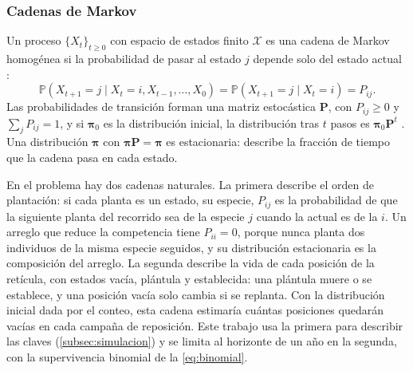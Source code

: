\subsubsection{Cadenas de Markov}
\label{subsec:markov}

Un proceso $\{X_t\}_{t\geq0}$ con espacio de estados finito $\mathcal{X}$ es una cadena de Markov homogénea si la probabilidad de pasar al estado $j$ depende solo del estado actual \autocite{:ross2014}:
\begin{equation}
  \mathbb{P}(X_{t+1}=j\mid X_t=i,X_{t-1},\dots,X_0)=\mathbb{P}(X_{t+1}=j\mid X_t=i)=P_{ij}.
  \label{eq:markov}
\end{equation}
Las probabilidades de transición forman una matriz estocástica $\mathbf{P}$, con $P_{ij}\geq0$ y $\sum_jP_{ij}=1$, y si $\boldsymbol{\pi}_0$ es la distribución inicial, la distribución tras $t$ pasos es $\boldsymbol{\pi}_0\mathbf{P}^{t}$ \autocite{:norris1997}. Una distribución $\boldsymbol{\pi}$ con $\boldsymbol{\pi}\mathbf{P}=\boldsymbol{\pi}$ es estacionaria: describe la fracción de tiempo que la cadena pasa en cada estado.

En el problema hay dos cadenas naturales. La primera describe el orden de plantación: si cada planta es un estado, su especie, $P_{ij}$ es la probabilidad de que la siguiente planta del recorrido sea de la especie $j$ cuando la actual es de la $i$. Un arreglo que reduce la competencia tiene $P_{ii}=0$, porque nunca planta dos individuos de la misma especie seguidos, y su distribución estacionaria es la composición del arreglo. La segunda describe la vida de cada posición de la retícula, con estados vacía, plántula y establecida: una plántula muere o se establece, y una posición vacía solo cambia si se replanta. Con la distribución inicial dada por el conteo, esta cadena estimaría cuántas posiciones quedarán vacías en cada campaña de reposición. Este trabajo usa la primera para describir las claves (\cref{subsec:simulacion}) y se limita al horizonte de un año en la segunda, con la supervivencia binomial de la \cref{eq:binomial}.
